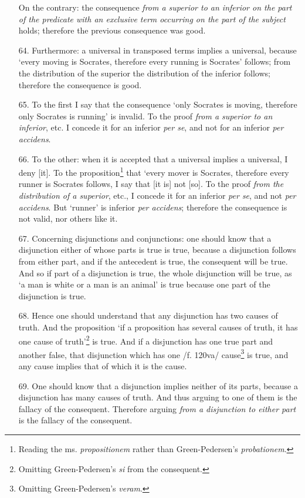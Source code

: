 \documentclass[]{article}
\begin{document}
\begin{enumerate}
On the contrary: the consequence \textit{from a superior to an inferior on the part of the predicate with an exclusive term occurring on the part of the subject} holds; therefore the previous consequence was good.
\item[64.] Furthermore: a universal in transposed terms implies a universal, because `every moving is Socrates, therefore every running is Socrates' follows; from the distribution of the superior the distribution of the inferior follows; therefore the consequence is good.
\item[65.] To the first I say that the consequence `only Socrates is moving, therefore only Socrates is running' is invalid. To the proof \textit{from a superior to an inferior}, etc. I concede it for an inferior \textit{per se}, and not for an inferior \textit{per accidens}.
\item[66.] To the other: when it is accepted that a universal implies a universal, I deny [it]. To the proposition\footnote{Reading the ms. \textit{propositionem} rather than Green-Pedersen's \textit{probationem}.} that `every mover is Socrates, therefore every runner is Socrates follows, I say that [it is] not [so]. To the proof \textit{from the distribution of a superior}, etc., I concede it for an inferior \textit{per se}, and not \textit{per accidens}. But `runner' is inferior \textit{per accidens}; therefore the consequence is not valid, nor others like it. 
\item[67.] Concerning disjunctions and conjunctions: one should know that a disjunction either of whose parts is true is true, because a disjunction follows from either part, and if the antecedent is true, the consequent will be true. And so if part of a disjunction is true, the whole disjunction will be true, as `a man is white or a man is an animal' is true because one part of the disjunction is true.
\item[68.] Hence one should understand that any disjunction has two causes of truth. And the proposition `if a proposition has several causes of truth, it has one cause of truth'\footnote{Omitting Green-Pedersen's \textit{si} from the consequent.} is true. And if a disjunction has one true part and another false, that disjunction which has one /f. 120va/ cause\footnote{Omitting Green-Pedersen's \textit{veram}.} is true, and any cause implies that of which it is the cause.
\item[69.] One should know that a disjunction implies neither of its parts, because a disjunction has many causes of truth. And thus arguing to one of them is the fallacy of the consequent. Therefore arguing \textit{from a disjunction to either part} is the fallacy of the consequent.

\end{enumerate}
\end{document}
